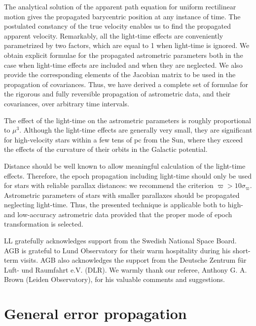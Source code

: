 \documentclass{aa}
\begin{document}
The analytical solution of the apparent path equation for uniform rectilinear motion gives the propagated barycentric position at any instance of time. The postulated constancy of the true velocity enables us to find the propagated apparent velocity. Remarkably, all the light-time effects are conveniently parametrized by two factors, which are equal to 1 when light-time is ignored. We obtain explicit formulae for the propagated astrometric parameters both in the case when light-time effects are included and when they are neglected. We also provide the corresponding elements of the Jacobian matrix to be used in the propagation of covariances. Thus, we have derived a complete set of formulae for the rigorous and fully reversible propagation of astrometric data, and their covariances, over arbitrary time intervals.

The effect of the light-time on the astrometric parameters is roughly proportional to $\mu^3$. Although the light-time effects are generally very small, they are significant for high-velocity stars within a few tens of pc from the Sun, where they exceed the effects of the curvature of their orbits in the Galactic potential.

Distance should be well known to allow meaningful calculation of the light-time effects. Therefore, the epoch propagation including light-time should only be used for stars with reliable parallax distances:
we recommend the criterion $\varpi > 10\sigma_\varpi$. Astrometric parameters of stars with smaller parallaxes should be propagated neglecting light-time. Thus, the presented technique is
applicable both to high- and low-accuracy astrometric data provided that the proper mode of epoch transformation is selected.

\begin{acknowledgements}
LL gratefully acknowledges support from the Swedish National Space Board. AGB is grateful to Lund Observatory for their warm hospitality during his short-term visits. AGB also acknowledges the support from the Deutsche Zentrum f\"ur Luft- und Raumfahrt e.V. (DLR). We warmly thank our referee, Anthony G. A. Brown (Leiden Observatory), for his valuable comments and suggestions.
\end{acknowledgements}




\appendix

\section{General error propagation}
\label{sec:genErrorProp}
\end{document}
